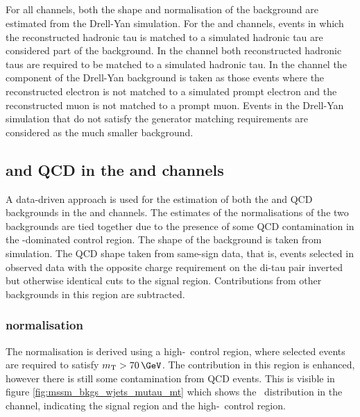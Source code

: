 \subsection{\texorpdfstring{\Ztautau}{Z to tau tau}}
\label{sec:mssm_bkgs_ztt}
For all channels, both the shape and normalisation of the \Ztautau background 
are estimated from the Drell-Yan
simulation.
For the \mutau and \etau channels, events
in which the reconstructed hadronic tau is matched to 
a simulated hadronic tau are considered part of the \Ztautau
background. In the \tautau channel both reconstructed
hadronic taus are required to be matched to a simulated hadronic tau. 
In the \emu channel the \Ztautau component of the Drell-Yan background 
is taken as those events where the reconstructed electron is not matched to
a simulated prompt electron and the reconstructed
muon is not matched to a prompt muon. 
Events in the Drell-Yan simulation 
that do not satisfy the generator matching requirements are considered
as the much smaller \Zellell background.

\subsection{\texorpdfstring{\Wjets and QCD in the \etau and \mutau channels}{W+jets and QCD in the e tau and mu tau channels}}
\label{sec:mssm_bkgs_mtet_wjetsqcd}
A data-driven approach is used for the estimation of
both the \Wjets and QCD backgrounds in the \etau and \mutau channels. 
The estimates of the normalisations of the two backgrounds are tied
together due to the presence of some QCD contamination in the \Wjets-dominated
control region. The shape of the \Wjets background is taken
from simulation. The QCD shape taken from same-sign
data, that is, events selected in observed data with the opposite charge requirement
on the di-tau pair inverted but otherwise identical cuts to the signal region. Contributions
from other backgrounds in this region are subtracted.

\subsubsection{\texorpdfstring{\Wjets normalisation}{W+jets normalisation}}
\label{sec:mssm_bkgs_mtet_wjetsnorm}
The \Wjets normalisation is derived using a high-\mT~control region, where
selected events are required to satisfy $\mTm>70\,\GeV$. The 
\Wjets
contribution in this region is enhanced, however there is still
some contamination from QCD events. This is visible in 
figure \ref{fig:mssm_bkgs_wjets_mutau_mt} which shows the \mT~distribution in the
\mutau channel, indicating the signal region and the high-\mT~control region. 

